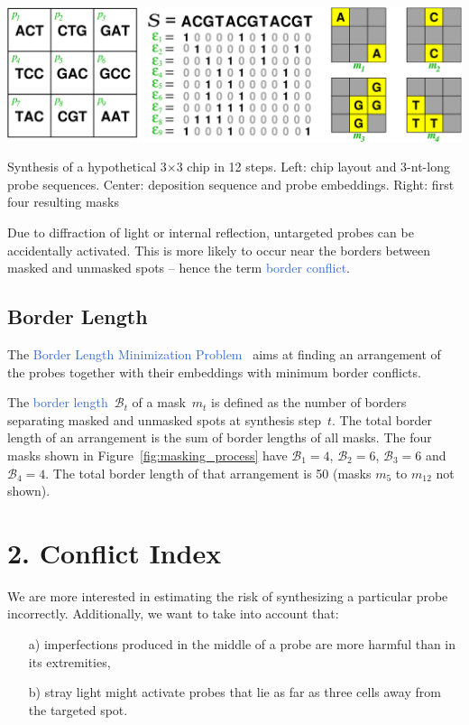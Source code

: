 \documentclass[portrait]{a0poster}
\newcommand{\myemph}[1]{\textcolor{highlight}{#1}}
\begin{document}
\begin{multicols}{3}[\aggiheader]
\begin{myfigure}
\vspace*{3ex}
\centerline{\includegraphics[width=750pt]{chip}}
\caption{Synthesis of a hypothetical 3$\times$3 chip in 12 steps. Left: chip
layout and 3-nt-long probe sequences. Center: deposition sequence and probe
embeddings. Right: first four resulting masks}
\label{fig:masking_process}
\vspace*{2ex}
\end{myfigure}

Due to diffraction of light or internal reflection, untargeted probes
can be accidentally activated. This is more likely to occur near the borders
between masked and unmasked spots -- hence the term
\myemph{border conflict}.

\subsection*{Border Length}

The \myemph{Border Length Minimization Problem}~\cite{HANNENHALLI02}
aims at finding an arrangement of the probes together with their embeddings with
minimum border conflicts.

The \myemph{border length}~$\mathcal{B}_t$ of
a mask~$m_{t}$ is defined as the number of borders separating masked and
unmasked spots at synthesis step~$t$. The total border length of an arrangement
is the sum of border lengths of all masks. The four masks shown in
Figure~\ref{fig:masking_process} have $\mathcal{B}_1 = 4$, $\mathcal{B}_2 = 6$,
$\mathcal{B}_3 = 6$ and $\mathcal{B}_4 = 4$. The total border length of that
arrangement is 50 (masks $m_5$ to $m_12$ not shown).

\section*{\textcolor{aggigreen}{2. Conflict Index}}

We are more interested in estimating the risk of synthesizing a
particular probe incorrectly. Additionally, we want to take into account that:
\begin{itemize}
\item[a)] imperfections produced in the middle of a probe are more harmful than
in its extremities,
\item[b)] stray light might activate probes that lie as far as three cells away
from the targeted spot.
\end{itemize}


\end{multicols}
\end{document}
